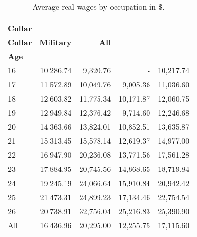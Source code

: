 \begin{ThreePartTable}

	\begin{longtable}[c]{@{}lrrrr@{}}
		\caption{Average real wages by occupation in \$.}
		\label{tab:AverageWages}

		\setlength\extrarowheight{2.5pt}
		
		\\
		\toprule
       & \thead{\textbf{Blue-} \\ \textbf{Collar}}    & \thead{\textbf{White-} \\ \textbf{Collar}}  & \textbf{Military}  & \textbf{All}   \\
\textbf{Age} &        &         &  &       \\ \midrule
		\endfirsthead
		
16	&	10,286.74	&	9,320.76	&		- &	10,217.74 \\
17	&	11,572.89	&	10,049.76	&	9,005.36	&	11,036.60\\
18	&	12,603.82	&	11,775.34	&	10,171.87	&	12,060.75\\
19	&	12,949.84	&	12,376.42	&	9,714.60	&	12,246.68\\
20	&	14,363.66	&	13,824.01	&	10,852.51	&	13,635.87\\
21	&	15,313.45	&	15,578.14	&	12,619.37	&	14,977.00\\
22	&	16,947.90	&	20,236.08	&	13,771.56	&	17,561.28\\
23	&	17,884.95	&	20,745.56	&	14,868.65	&	18,719.84\\
24	&	19,245.19	&	24,066.64	&	15,910.84	&	20,942.42\\
25	&	21,473.31	&	24,899.23	&	17,134.46	&	22,754.54\\
26	&	20,738.91	&	32,756.04	&	25,216.83	&	25,390.90\\
All	&	16,436.96	&	20,295.00	&	12,255.75	&	17,115.60\\



  \bottomrule
	\end{longtable}
\end{ThreePartTable}
